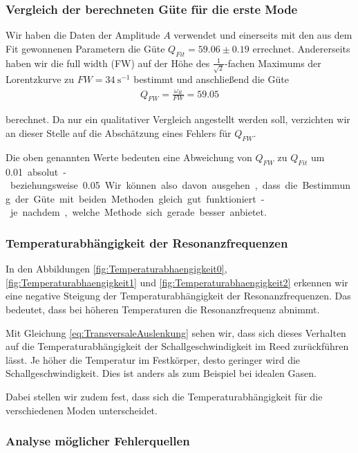 \subsubsection*{Vergleich der berechneten Güte für die erste Mode}

Wir haben die Daten der Amplitude $A$ verwendet und einerseits mit den aus dem Fit gewonnenen Parametern die Güte $Q_{Fit} = 59.06 \pm 0.19$ errechnet.
Andererseits haben wir die full width (FW) auf der Höhe des $\frac{1}{\sqrt{2}}$-fachen Maximums der Lorentzkurve zu $FW = \SI{34}{\second^{-1}}$ bestimmt und anschließend die Güte
\begin{align}
    Q_{FW} = \frac{\omega_R}{FW} = 59.05
\end{align}

berechnet. Da nur ein qualitativer Vergleich angestellt werden soll, verzichten wir an dieser Stelle auf die Abschätzung eines Fehlers für $Q_{FW}$.

Die oben genannten Werte bedeuten eine Abweichung von $Q_{FW}$ zu $Q_{Fit}$ um \SI{0.01} absolut - beziehungsweise \SI{0.05}{\sigma}.
Wir können also davon ausgehen, dass die Bestimmung der Güte mit beiden Methoden gleich gut funktioniert - je nachdem, welche Methode sich gerade besser anbietet.

\subsubsection*{Temperaturabhängigkeit der Resonanzfrequenzen}

In den Abbildungen \ref{fig:Temperaturabhaengigkeit0}, \ref{fig:Temperaturabhaengigkeit1} und \ref{fig:Temperaturabhaengigkeit2} erkennen wir eine negative Steigung der Temperaturabhängigkeit der Resonanzfrequenzen.
Das bedeutet, dass bei höheren Temperaturen die Resonanzfrequenz abnimmt.

Mit Gleichung \ref{eq:TransversaleAuslenkung} sehen wir, dass sich dieses Verhalten auf die Temperaturabhängigkeit der Schallgeschwindigkeit im Reed zurückführen lässt.
Je höher die Temperatur im Festkörper, desto geringer wird die Schallgeschwindigkeit.
Dies ist anders als zum Beispiel bei idealen Gasen.


Dabei stellen wir zudem fest, dass sich die Temperaturabhängigkeit für die verschiedenen Moden unterscheidet.

\subsubsection*{Analyse möglicher Fehlerquellen}

